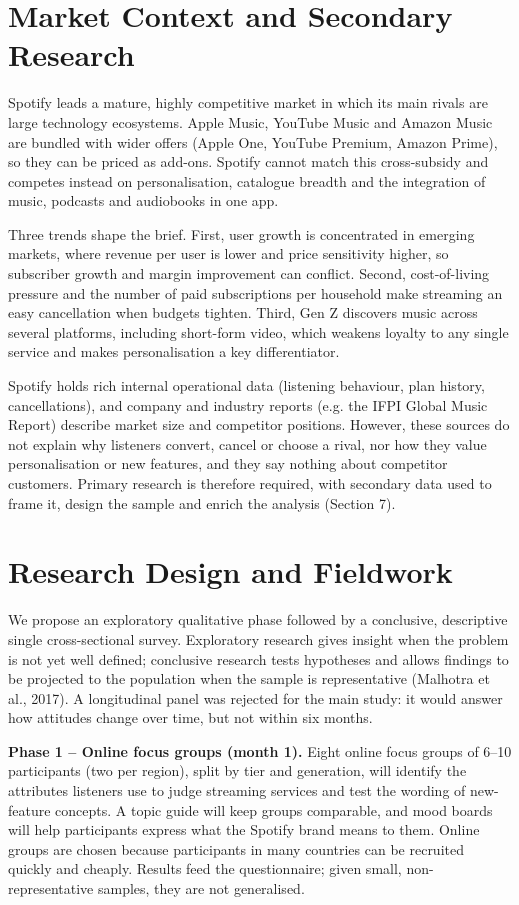 \documentclass[11pt,a4paper]{article}
\begin{document}
\section{Market Context and Secondary Research}
Spotify leads a mature, highly competitive market in which its main rivals are large technology ecosystems. Apple Music, YouTube Music and Amazon Music are bundled with wider offers (Apple One, YouTube Premium, Amazon Prime), so they can be priced as add-ons. Spotify cannot match this cross-subsidy and competes instead on personalisation, catalogue breadth and the integration of music, podcasts and audiobooks in one app.

Three trends shape the brief. First, user growth is concentrated in emerging markets, where revenue per user is lower and price sensitivity higher, so subscriber growth and margin improvement can conflict. Second, cost-of-living pressure and the number of paid subscriptions per household make streaming an easy cancellation when budgets tighten. Third, Gen Z discovers music across several platforms, including short-form video, which weakens loyalty to any single service and makes personalisation a key differentiator.

Spotify holds rich internal operational data (listening behaviour, plan history, cancellations), and company and industry reports (e.g. the IFPI Global Music Report) describe market size and competitor positions. However, these sources do not explain why listeners convert, cancel or choose a rival, nor how they value personalisation or new features, and they say nothing about competitor customers. Primary research is therefore required, with secondary data used to frame it, design the sample and enrich the analysis (Section 7).

\section{Research Design and Fieldwork}
We propose an exploratory qualitative phase followed by a conclusive, descriptive single cross-sectional survey. Exploratory research gives insight when the problem is not yet well defined; conclusive research tests hypotheses and allows findings to be projected to the population when the sample is representative (Malhotra et al., 2017). A longitudinal panel was rejected for the main study: it would answer how attitudes change over time, but not within six months.

\textbf{Phase 1 – Online focus groups (month 1).} Eight online focus groups of 6–10 participants (two per region), split by tier and generation, will identify the attributes listeners use to judge streaming services and test the wording of new-feature concepts. A topic guide will keep groups comparable, and mood boards will help participants express what the Spotify brand means to them. Online groups are chosen because participants in many countries can be recruited quickly and cheaply. Results feed the questionnaire; given small, non-representative samples, they are not generalised.
\end{document}
